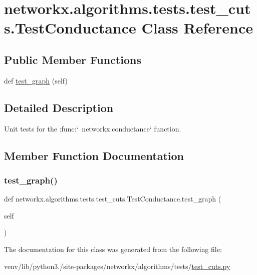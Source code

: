 \hypertarget{classnetworkx_1_1algorithms_1_1tests_1_1test__cuts_1_1TestConductance}{}\section{networkx.\+algorithms.\+tests.\+test\+\_\+cuts.\+Test\+Conductance Class Reference}
\label{classnetworkx_1_1algorithms_1_1tests_1_1test__cuts_1_1TestConductance}
\subsection*{Public Member Functions}
\begin{DoxyCompactItemize}
\item 
def \hyperlink{classnetworkx_1_1algorithms_1_1tests_1_1test__cuts_1_1TestConductance_a54b872157bb1713032854581ff0d424a}{test\+\_\+graph} (self)
\end{DoxyCompactItemize}


\subsection{Detailed Description}
\begin{DoxyVerb}Unit tests for the :func:`~networkx.conductance` function.\end{DoxyVerb}
 

\subsection{Member Function Documentation}
\mbox{\label{classnetworkx_1_1algorithms_1_1tests_1_1test__cuts_1_1TestConductance_a54b872157bb1713032854581ff0d424a}} 
\subsubsection{\texorpdfstring{test\+\_\+graph()}{test\_graph()}}
{\footnotesize\ttfamily def networkx.\+algorithms.\+tests.\+test\+\_\+cuts.\+Test\+Conductance.\+test\+\_\+graph (\begin{DoxyParamCaption}\item[{}]{self }\end{DoxyParamCaption})}



The documentation for this class was generated from the following file\+:\begin{DoxyCompactItemize}
\item 
venv/lib/python3./site-\/packages/networkx/algorithms/tests/\hyperlink{tests_2test__cuts_8py}{test\+\_\+cuts.\+py}\end{DoxyCompactItemize}
